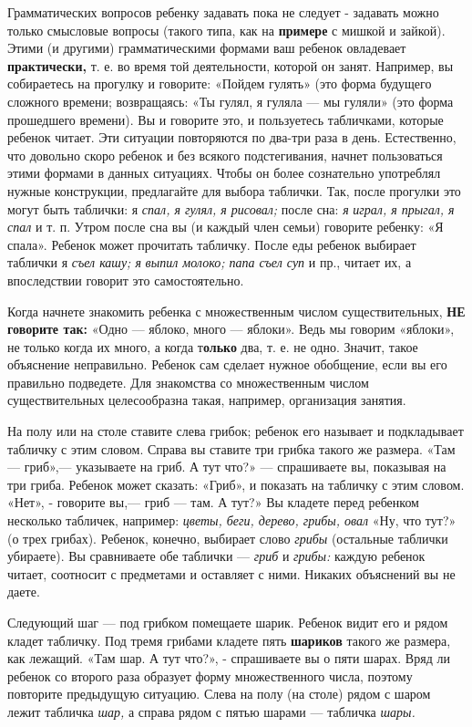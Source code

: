 \documentclass[a5paper]{book}
\renewcommand{\emph}[1]{\textit{#1}}
\begin{document}
Грамматических вопросов ребенку задавать пока не следует - задавать
можно только смысловые вопросы (такого типа, как на \textbf{примере} с
мишкой и зайкой). Этими (и другими) грамматическими формами ваш ребенок
овладевает \textbf{практически,} т. е. во время той деятельности,
которой он занят. Например, вы собираетесь на прогулку и говорите:
«Пойдем гулять» (это форма будущего сложного времени; возвращаясь: «Ты
гулял, я гуляла --- мы гуляли» (это форма прошедшего времени). Вы и
говорите это, и пользуетесь табличками, которые ребенок читает. Эти
ситуации повторяются по два-три раза в день. Естественно, что довольно
скоро ребенок и без всякого подстегивания, начнет пользоваться этими
формами в данных ситуациях. Чтобы он более сознательно употреблял нужные
конструкции, предлагайте для выбора таблички. Так, после прогулки это
могут быть таблички: я \emph{спал, я гулял, я рисовал;} после сна:
\emph{я} \emph{играл, я прыгал, я спал} и т. п. Утром после сна вы (и
каждый член семьи) говорите ребенку: «Я спала». Ребенок может прочитать
табличку. После еды ребенок выбирает таблички я \emph{съел кашу; я}
\emph{выпил молоко; папа съел суп} и пр., читает их, а впоследствии
говорит это самостоятельно.

Когда начнете знакомить ребенка с множественным числом существительных,
\textbf{НЕ говорите так:} «Одно --- яблоко, много --- яблоки». Ведь мы
говорим «яблоки», не только когда их много, а когда т\textbf{олько} два,
т. е. не одно. Значит, такое объяснение неправильно. Ребенок сам сделает
нужное обобщение, если вы его правильно подведете. Для знакомства со
множественным числом существительных целесообразна такая, например,
организация занятия.

На полу или на столе ставите слева грибок; ребенок его называет и
подкладывает табличку с этим словом. Справа вы ставите три грибка такого
же размера. «Там --- гриб»,--- указываете на гриб. А тут что?» ---
спрашиваете вы, показывая на три гриба. Ребенок может сказать: «Гриб», и
показать на табличку с этим словом. «Нет», - говорите вы,--- гриб ---
там. А тут?» Вы кладете перед ребенком несколько табличек, например:
\emph{цветы, беги, дерево, грибы, овал} «Ну, что тут?» (о трех грибах).
Ребенок, конечно, выбирает слово \emph{грибы} (остальные таблички
убираете). Вы сравниваете обе таблички --- \emph{гриб} и \emph{грибы:}
каждую ребенок читает, соотносит с предметами и оставляет с ними.
Никаких объяснений вы не даете.

Следующий шаг --- под грибком помещаете шарик. Ребенок видит его и рядом
кладет табличку. Под тремя грибами кладете пять \textbf{шариков} такого
же размера, как лежащий. «Там шар. А тут что?», - спрашиваете вы о пяти
шарах. Вряд ли ребенок со второго раза образует форму множественного
числа, поэтому повторите предыдущую ситуацию. Слева на полу (на столе)
рядом с шаром лежит табличка \emph{шар,} а справа рядом с пятью шарами
--- табличка \emph{шары.}
\end{document}
